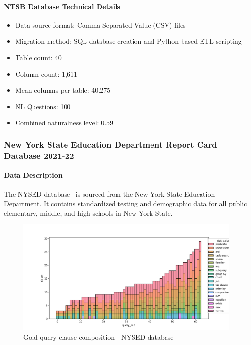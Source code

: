 \paragraph{NTSB Database Technical Details}
\begin{itemize}
  \item Data source format: Comma Separated Value (CSV) files
  \item Migration method: SQL database creation and Python-based ETL scripting
  \item Table count: 40
  \item Column count: 1,611
  \item Mean columns per table: 40.275
  \item NL Questions: 100
  \item Combined naturalness level: 0.59 
\end{itemize}


\subsubsection{New York State Education Department Report Card Database 2021-22}

\paragraph{Data Description}
The NYSED database~\cite{nysed-report-card} is sourced from the New York State Education Department.
It contains standardized testing and demographic data for all public elementary, middle, and high schools in New York State.

\begin{figure}[H]
  \centering
  \includegraphics[width=\linewidth]{figures/query-stats/NYSED_SRC2022-stats-clause-counts.png}
  \caption{Gold query clause composition - NYSED database}
  \label{fig:query-complexity-nysed}
\end{figure}

